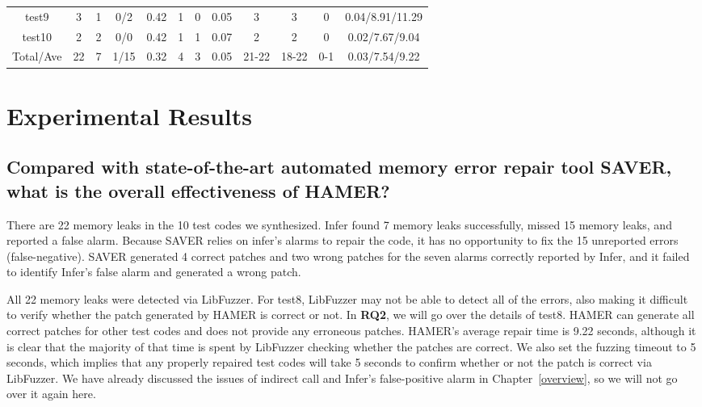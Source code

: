 \documentclass[a4paper,11pt,oneside,openany]{book}
\begin{document}
\begin{table}[h]
{{\begin{tabular}{cc|ccc|ccc|cccc}
    test9         & 3  & 1  & 0/2     & 0.42  & 1  & 0  & 0.05      & 3   & 3    & 0  & 0.04/8.91/11.29 \\
    test10       & 2  & 2  & 0/0     & 0.42  & 1  & 1  &  0.07      &  2  & 2  & 0 & 0.02/7.67/9.04 \\
    \hline
   Total/Ave & 22  & 7  & 1/15  & 0.32  & 4  & 3  &  0.05      &  21-22  & 18-22  & 0-1 & 0.03/7.54/9.22 \\
    \hline
  \end{tabular}
}}
\end{table}

\section{Experimental Results}

\subsection[Research Question 1]{Compared with state-of-the-art automated memory error repair tool SAVER, what is the overall effectiveness of HAMER?}

There are 22 memory leaks in the 10 test codes we synthesized. Infer found 7 memory leaks successfully, missed 15 memory leaks, and reported a false alarm. Because SAVER relies on infer's alarms to repair the code, it has no opportunity to fix the 15 unreported errors (false-negative). SAVER generated 4 correct patches and two wrong patches for the seven alarms correctly reported by Infer, and it failed to identify Infer's false alarm and generated a wrong patch.

All 22 memory leaks were detected via LibFuzzer. For test8, LibFuzzer may not be able to detect all of the errors, also making it difficult to verify whether the patch generated by HAMER is correct or not. In \textbf{RQ2}, we will go over the details of test8. HAMER can generate all correct patches for other test codes and does not provide any erroneous patches. HAMER's average repair time is 9.22 seconds, although it is clear that the majority of that time is spent by LibFuzzer checking whether the patches are correct. We also set the fuzzing timeout to 5 seconds, which implies that any properly repaired test codes will take 5 seconds to confirm whether or not the patch is correct via LibFuzzer. We have already discussed the issues of indirect call and Infer's false-positive alarm in Chapter~\ref{overview}, so we will not go over it again here.
\end{document}
